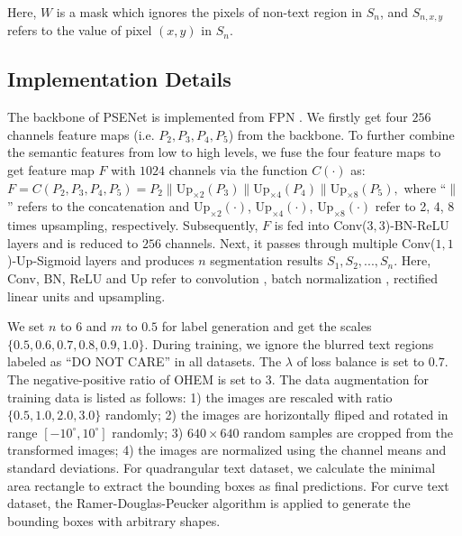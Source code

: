 \documentclass{article}
\begin{document}
Here, $W$ is a mask which ignores the pixels of non-text region in $S_n$, and $S_{n, x, y}$ refers to the value of pixel $(x, y)$ in $S_n$.

\subsection{Implementation Details}
The backbone of PSENet is implemented from FPN \cite{lin2017feature}. We firstly get four $256$ channels feature maps (i.e. $P_2, P_3, P_4, P_5$) from the backbone. To further combine the semantic features from low to high levels, we fuse the four feature maps to get feature map $F$ with $1024$ channels via the function $C(\cdot)$ as: $
F = C(P_2, P_3, P_4, P_5) = P_2 \parallel \mbox{Up}_{\times 2}(P_3) \parallel \mbox{Up}_{\times 4}(P_4) \parallel \mbox{Up}_{\times 8}(P_5),
$
where ``$\parallel$'' refers to the concatenation and $\mbox{Up}_{\times 2}(\cdot)$, $\mbox{Up}_{\times 4}(\cdot)$, $\mbox{Up}_{\times 8}(\cdot)$ refer to 2, 4, 8 times upsampling, respectively. Subsequently, $F$ is fed into Conv($3, 3$)-BN-ReLU layers and is reduced to $256$ channels. Next, it passes through multiple 
Conv($1, 1$)-$\mbox{Up}$-Sigmoid layers and produces $n$ segmentation results $S_1, S_2, ..., S_n$. Here, Conv, BN, ReLU and $\mbox{Up}$ refer to convolution \cite{lecun1998gradient}, batch normalization \cite{ioffe2015batch}, rectified linear units \cite{glorot2011deep} and upsampling.

We set $n$ to $6$ and $m$ to $0.5$ for label generation and get the scales $\{0.5, 0.6, 0.7, 0.8, 0.9, 1.0\}$. During training, we ignore the blurred text regions labeled as “DO NOT CARE” in all datasets. The $\lambda$ of loss balance is set to $0.7$. The negative-positive ratio of OHEM is set to 3. The data augmentation for training data is listed as follows: 1) the images are rescaled with ratio $\{0.5, 1.0, 2.0, 3.0\}$ randomly; 2) the images are horizontally fliped and rotated in range $[-10^\circ, 10^\circ]$ randomly; 3) $640 \times 640$ random samples are cropped from the transformed images; 4) the images are normalized using the channel means and standard deviations. 
For quadrangular text dataset, we calculate the minimal area rectangle to extract the bounding boxes as final predictions. For curve text dataset, the Ramer-Douglas-Peucker algorithm \cite{ramer1972iterative} is applied to generate the bounding boxes with arbitrary shapes. 
\end{document}
